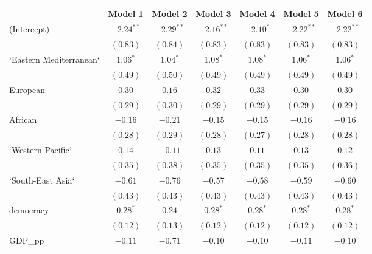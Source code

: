 
\begin{table}[!h]
\begin{center}
\begin{tabular}{l c c c c c c }
\toprule
 & Model 1 & Model 2 & Model 3 & Model 4 & Model 5 & Model 6 \\
\midrule
(Intercept)             & $-2.24^{**}$ & $-2.29^{**}$ & $-2.16^{**}$ & $-2.10^{*}$  & $-2.22^{**}$ & $-2.22^{**}$ \\
                        & $(0.83)$     & $(0.84)$     & $(0.83)$     & $(0.83)$     & $(0.83)$     & $(0.83)$     \\
`Eastern Mediterranean` & $1.06^{*}$   & $1.04^{*}$   & $1.08^{*}$   & $1.08^{*}$   & $1.06^{*}$   & $1.06^{*}$   \\
                        & $(0.49)$     & $(0.50)$     & $(0.49)$     & $(0.49)$     & $(0.49)$     & $(0.49)$     \\
European                & $0.30$       & $0.16$       & $0.32$       & $0.33$       & $0.30$       & $0.30$       \\
                        & $(0.29)$     & $(0.30)$     & $(0.29)$     & $(0.29)$     & $(0.29)$     & $(0.29)$     \\
African                 & $-0.16$      & $-0.21$      & $-0.15$      & $-0.15$      & $-0.16$      & $-0.16$      \\
                        & $(0.28)$     & $(0.29)$     & $(0.28)$     & $(0.27)$     & $(0.28)$     & $(0.28)$     \\
`Western Pacific`       & $0.14$       & $-0.11$      & $0.13$       & $0.11$       & $0.13$       & $0.12$       \\
                        & $(0.35)$     & $(0.38)$     & $(0.35)$     & $(0.35)$     & $(0.35)$     & $(0.36)$     \\
`South-East Asia`       & $-0.61$      & $-0.76$      & $-0.57$      & $-0.58$      & $-0.59$      & $-0.60$      \\
                        & $(0.43)$     & $(0.43)$     & $(0.43)$     & $(0.43)$     & $(0.43)$     & $(0.43)$     \\
democracy               & $0.28^{*}$   & $0.24$       & $0.28^{*}$   & $0.28^{*}$   & $0.28^{*}$   & $0.28^{*}$   \\
                        & $(0.12)$     & $(0.13)$     & $(0.12)$     & $(0.12)$     & $(0.12)$     & $(0.12)$     \\
GDP\_pp                 & $-0.11$      & $-0.71$      & $-0.10$      & $-0.10$      & $-0.11$      & $-0.10$      \\

\end{tabular}
\end{center}
\end{table}
